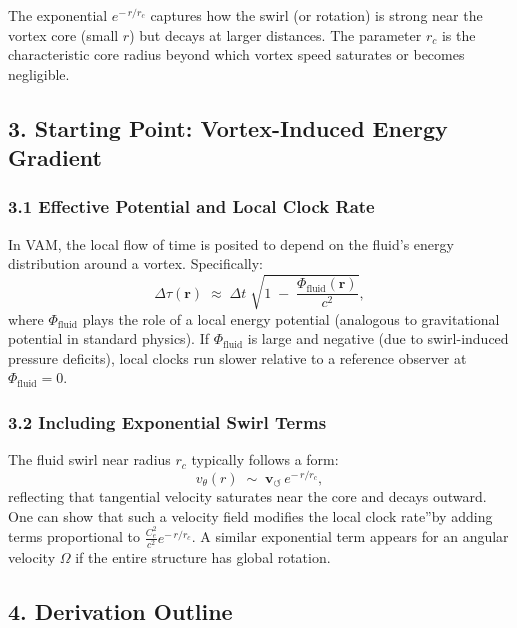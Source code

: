 The exponential \(e^{-\,r/r_c}\) captures how the swirl (or rotation) is strong near the vortex core (small \(r\)) but decays at larger distances. The parameter \(r_c\) is the characteristic core radius beyond which vortex speed saturates or becomes negligible.

\subsection*{3. Starting Point: Vortex-Induced Energy Gradient}

\subsubsection*{3.1 Effective Potential and Local Clock Rate}

In VAM, the local flow of time is posited to depend on the fluid's energy distribution around a vortex. Specifically:
\[
    \Delta \tau(\mathbf{r})
    \;\approx\;
    \Delta t
    \;\sqrt{
        1
        \;-\;
        \frac{\Phi_{\mathrm{fluid}}(\mathbf{r})}{c^2}
    },
\]
where \(\Phi_{\mathrm{fluid}}\) plays the role of a local energy potential (analogous to gravitational potential in standard physics). If \(\Phi_{\mathrm{fluid}}\) is large and negative (due to swirl-induced pressure deficits), local clocks run slower relative to a reference observer at \(\Phi_{\mathrm{fluid}}=0\).

\subsubsection*{3.2 Including Exponential Swirl Terms}

The fluid swirl near radius \(r_c\) typically follows a form:
\[
    v_{\theta}(r)
    \;\sim\;
    \mathbf{v}_{\scriptscriptstyle\boldsymbol{\circlearrowleft}} \,e^{-\,r/r_c},
\]
reflecting that tangential velocity saturates near the core and decays outward. One can show that such a velocity field modifies the local \grqq clock rate\textquotedblright by adding terms proportional to \(\tfrac{C_e^2}{c^2} e^{-\,r/r_c}\). A similar exponential term appears for an angular velocity \(\Omega\) if the entire structure has global rotation.

\subsection*{4. Derivation Outline}

